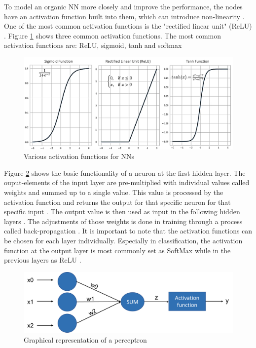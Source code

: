 To model an organic NN more closely and improve the performance, the nodes have an activation function built into them, which can introduce non-linearity \cite{Goyal}. One of the most common activation functions is the "rectified linear unit" (ReLU) \cite{Goodfellow}. Figure \ref{fig:AF} shows three common activation functions. The most common activation functions are: ReLU, sigmoid, tanh and softmax \cite{Activation}

\begin{figure}[H]
	\centering
	\includegraphics[width=0.8\linewidth]{IMGs/Active.png}
	\caption{Various activation functions for NNs \cite{Activation}}
	\label{fig:AF}
\end{figure}

Figure \ref{fig:PC} shows the basic functionality of a neuron at the first hidden layer. The ouput-elements of the input layer are pre-multiplied with individual values called weights and summed up to a single value. This value is processed by the activation function and returns the output for that specific neuron for that specific input \cite{BattaMahesh}. The output value is then used as input in the following hidden layers \cite{Ding}. The adjustments of those weights is done in training through a process called back-propagation \cite{Chauvin}. 
It is important to note that the activation functions can be chosen for each layer individually. Especially in classification, the activation function at the output layer is most commonly set as SoftMax while in the previous layers as ReLU \cite{Asadi}. 

\begin{figure}[H]
	\centering
	\includegraphics[width=0.8\linewidth]{IMGs/PEC.png}
	\caption{Graphical representation of a perceptron \cite{Ding}}
	\label{fig:PC}
\end{figure}

